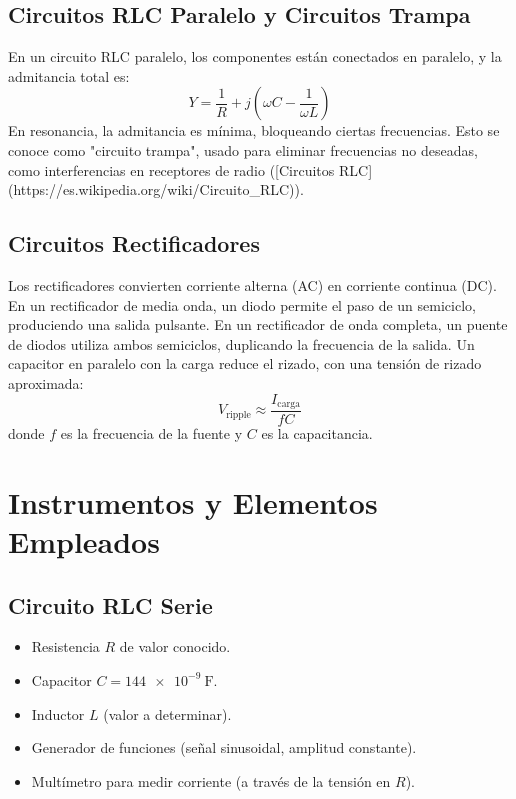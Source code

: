 \documentclass[a4paper,12pt]{article}
\begin{document}
\subsection{Circuitos RLC Paralelo y Circuitos Trampa}
En un circuito RLC paralelo, los componentes están conectados en paralelo, y la admitancia total es:
\[
Y = \frac{1}{R} + j \left( \omega C - \frac{1}{\omega L} \right)
\]
En resonancia, la admitancia es mínima, bloqueando ciertas frecuencias. Esto se conoce como "circuito trampa", usado para eliminar frecuencias no deseadas, como interferencias en receptores de radio ([Circuitos RLC](https://es.wikipedia.org/wiki/Circuito_RLC)).

\subsection{Circuitos Rectificadores}
Los rectificadores convierten corriente alterna (AC) en corriente continua (DC). En un rectificador de media onda, un diodo permite el paso de un semiciclo, produciendo una salida pulsante. En un rectificador de onda completa, un puente de diodos utiliza ambos semiciclos, duplicando la frecuencia de la salida. Un capacitor en paralelo con la carga reduce el rizado, con una tensión de rizado aproximada:
\[
V_{\text{ripple}} \approx \frac{I_{\text{carga}}}{f C}
\]
donde \( f \) es la frecuencia de la fuente y \( C \) es la capacitancia.

\section{Instrumentos y Elementos Empleados}
\subsection{Circuito RLC Serie}
\begin{itemize}
    \item Resistencia \( R \) de valor conocido.
    \item Capacitor \( C = \SI{144e-9}{\farad} \).
    \item Inductor \( L \) (valor a determinar).
    \item Generador de funciones (señal sinusoidal, amplitud constante).
    \item Multímetro para medir corriente (a través de la tensión en \( R \)).
\end{itemize}
\end{document}
